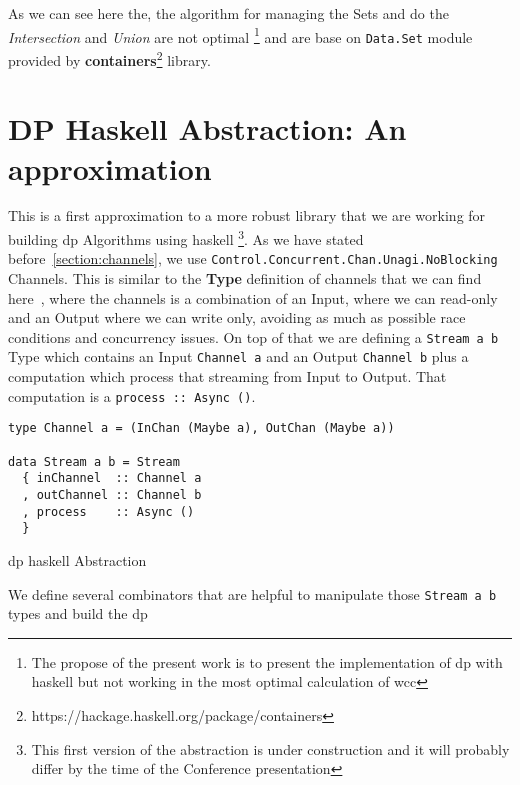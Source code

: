 \documentclass[12pt]{article}
\begin{document}
As we can see here the, the algorithm for managing the Sets and do the \textit{Intersection} and \textit{Union} are not optimal\label{not:optimal}
\footnote{The propose of the present work is to present the implementation of \acrshort{dp} with \acrshort{haskell} but not working in the most optimal calculation of \acrshort{wcc}} and are base
on \texttt{Data.Set} module provided by \textbf{containers}\footnote{https://hackage.haskell.org/package/containers} library.

\section{DP Haskell Abstraction: An approximation}
This is a first approximation to a more robust library that we are working for building \acrshort{dp} Algorithms using \acrshort{haskell}
\footnote{This first version of the abstraction is under construction and it will probably differ by the time of the Conference presentation}.
As we have stated before~\ref{section:channels}, we use \texttt{Control.Concurrent.Chan.Unagi.NoBlocking} Channels. 
This is similar to the \textbf{Type} definition of channels that we can find here~\cite{parallel_book}, where the channels is a combination of an Input, where 
we can read-only and an Output where we can write only, avoiding as much as possible race conditions and concurrency issues.
On top of that we are defining a \texttt{Stream a b} Type which contains an Input \texttt{Channel a} and an Output \texttt{Channel b} 
plus a computation which process that streaming from Input to Output. That computation is a \texttt{process :: Async ()}.

\begin{listing}[H]
\begin{verbatim}  
type Channel a = (InChan (Maybe a), OutChan (Maybe a))

data Stream a b = Stream
  { inChannel  :: Channel a
  , outChannel :: Channel b
  , process    :: Async ()
  }

\end{verbatim}
\caption{\acrshort{dp} \acrshort{haskell} Abstraction}
\label{src:haskell:4}
\end{listing}

We define several combinators that are helpful to manipulate those \texttt{Stream a b} types and build the \acrshort{dp}
\end{document}
